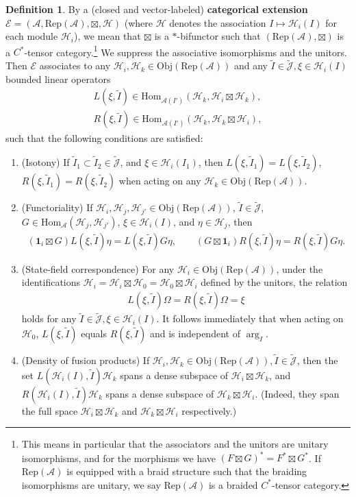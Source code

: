 \documentclass[11pt,b5paper,notitlepage]{article}
\theoremstyle{definition}
\newtheorem{df}{Definition}[section]
\theoremstyle{plain}
\newcommand{\fk}{\mathfrak}
\newcommand{\mc}{\mathcal}
\newcommand{\wtd}{\widetilde}
\newcommand{\id}{\mathbf{1}}
\newcommand{\Hom}{\mathrm{Hom}}
\newcommand{\Rep}{\mathrm{Rep}}
\newcommand{\scr}{\mathscr}
\newcommand{\Jtd}{\widetilde{\mathcal J}}
\newcommand{\RepA}{\mathrm{Rep}(\mathcal A)}
\newcommand{\Obj}{\mathrm{Obj}}
\numberwithin{equation}{section}
\begin{document}
\begin{df}\label{lb23}
By a (closed and vector-labeled) \textbf{categorical extension} $\scr E=(\mc A,\Rep(\mc A),\boxtimes,\mc H)$ (where $\mc H$ denotes the association $I\mapsto \mc H_i(I)$ for each module $\mc H_i$), we mean that $\boxtimes$ is a $*$-bifunctor such that $(\RepA,\boxtimes)$ is a  $C^*$-tensor category.\footnote{This means in particular that the associators and the unitors are unitary isomorphisms, and for the morphisms we have $(F\boxtimes G)^*=F^*\boxtimes G^*$. If $\Rep(\mc A)$ is equipped with a braid structure such that the braiding isomorphisms are unitary, we say $\Rep(\mc A)$ is a braided $C^*$-tensor category.} We suppress the associative isomorphisms and the unitors.   Then $\scr E$ associates to any  $\mc H_i,\mc H_k\in\Obj(\Rep(\mc A))$ and any $\wtd I\in\Jtd,\fk \xi\in\mc H_i(I)$ bounded linear operators
\begin{gather*}
	L(\xi,\wtd I)\in\Hom_{\mc A(I')}(\mc H_k,\mc H_i\boxtimes\mc H_k),\\
	R(\xi,\wtd I)\in\Hom_{\mc A(I')}(\mc H_k,\mc H_k\boxtimes\mc H_i),
\end{gather*}
such that the following conditions are satisfied:
\begin{enumerate}[label=(\alph*)]
\item (Isotony) If $\wtd I_1\subset\wtd I_2\in\Jtd$, and $\xi\in\mc H_i(I_1)$, then $L(\xi,\wtd I_1)=L(\xi,\wtd I_2)$, $R(\xi,\wtd I_1)=R(\xi,\wtd I_2)$ when acting on any  $\mc H_k\in\Obj(\Rep(\mc A))$.
\item (Functoriality) If $\mc H_i,\mc H_j,\mc H_{j'}\in\Obj(\RepA)$, $\wtd I\in\Jtd$, $G\in\Hom_{\mc A}(\mc H_j,\mc H_{j'})$,  $\xi\in\mc H_i(I)$, and $\eta\in\mc H_j$, then
\begin{align}
	(\id_i\boxtimes G)L(\xi,\wtd I)\eta=L(\xi,\wtd I)G\eta,\qquad (G\boxtimes \id_i)R(\xi,\wtd I)\eta=R(\xi,\wtd I)G\eta.
\end{align}
\item (State-field correspondence) For any $\mc H_i\in\Obj(\RepA)$, under the identifications $\mc H_i=\mc H_i\boxtimes\mc H_0=\mc H_0\boxtimes\mc H_i$ defined by the unitors, the relation
\begin{align}
	L(\xi,\wtd I)\Omega=R(\xi,\wtd I)\Omega=\xi\label{eq14}
\end{align}
holds for any $\wtd I\in\Jtd,\xi\in\mc H_i(I)$. It follows immediately that when acting on $\mc H_0$, $L(\xi,\wtd I)$ equals $R(\xi,\wtd I)$ and is independent of $\arg_I$.
\item (Density of fusion products) If $\mc H_i,\mc H_k\in\Obj(\RepA),\wtd I\in\Jtd$, then the set $L(\mc H_i(I),\wtd I)\mc H_k$ spans a dense subspace of $\mc H_i\boxtimes\mc H_k$, and $R(\mc H_i(I),\wtd I)\mc H_k$ spans a dense subspace of $\mc H_k\boxtimes\mc H_i$. (Indeed, they span the full space $\mc H_i\boxtimes\mc H_k$ and $\mc H_k\boxtimes\mc H_i$ respectively.)

\end{enumerate}
\end{df}
\end{document}
